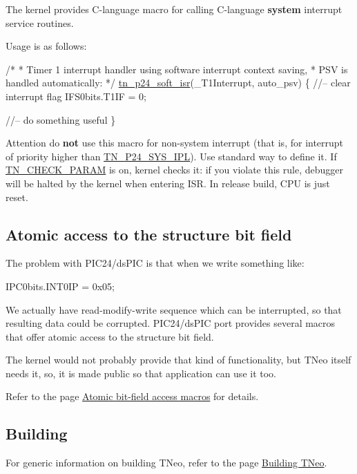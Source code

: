 The kernel provides C-\/language macro for calling C-\/language {\bfseries system} interrupt service routines.

Usage is as follows\+:


\begin{DoxyCode}
\textcolor{comment}{/* }
\textcolor{comment}{ * Timer 1 interrupt handler using software interrupt context saving,  }
\textcolor{comment}{ * PSV is handled automatically:}
\textcolor{comment}{ */}
\hyperlink{tn__arch__pic24_8h_a0b184d3c15066f5504144379d2624ff3}{tn\_p24\_soft\_isr}(\_T1Interrupt, auto\_psv)
\{
   \textcolor{comment}{//-- clear interrupt flag}
   IFS0bits.T1IF = 0;

   \textcolor{comment}{//-- do something useful}
\}
\end{DoxyCode}


\begin{DoxyAttention}{Attention}
do {\bfseries not} use this macro for non-\/system interrupt (that is, for interrupt of priority higher than {\ttfamily \hyperlink{tn__cfg__default_8h_a4feb7eb34fc2f175167b7496b63c398a}{T\+N\+\_\+\+P24\+\_\+\+S\+Y\+S\+\_\+\+I\+P\+L}}). Use standard way to define it. If {\ttfamily \hyperlink{tn__cfg__default_8h_a1f197294df3276fec431930545acafd5}{T\+N\+\_\+\+C\+H\+E\+C\+K\+\_\+\+P\+A\+R\+A\+M}} is on, kernel checks it\+: if you violate this rule, debugger will be halted by the kernel when entering I\+S\+R. In release build, C\+P\+U is just reset.
\end{DoxyAttention}
\hypertarget{arch_specific_pic24_bfa}{}\subsection{Atomic access to the structure bit field}\label{arch_specific_pic24_bfa}
The problem with P\+I\+C24/ds\+P\+I\+C is that when we write something like\+:


\begin{DoxyCode}
IPC0bits.INT0IP = 0x05;
\end{DoxyCode}


We actually have read-\/modify-\/write sequence which can be interrupted, so that resulting data could be corrupted. P\+I\+C24/ds\+P\+I\+C port provides several macros that offer atomic access to the structure bit field.

The kernel would not probably provide that kind of functionality, but T\+Neo itself needs it, so, it is made public so that application can use it too.

Refer to the page \hyperlink{tn__arch__pic24__bfa_8h}{Atomic bit-\/field access macros} for details.\hypertarget{arch_specific_pic24_building}{}\subsection{Building}\label{arch_specific_pic24_building}
For generic information on building T\+Neo, refer to the page \hyperlink{building}{Building T\+Neo}.

